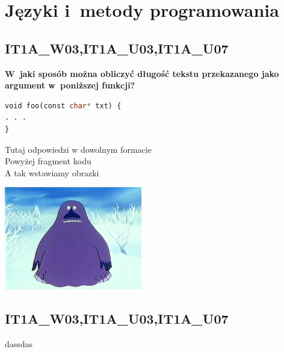 \chapter{Języki i~metody programowania}
\PartialToc
\section{IT1A\_W03,IT1A\_U03,IT1A\_U07}
\textbf{W~jaki sposób można obliczyć długość tekstu przekazanego jako argument w~poniższej funkcji?}
\begin{lstlisting}[language=sql]
void foo(const char* txt) {
. . .
}
\end{lstlisting}

\vspace{0.4cm}
\noindent  Tutaj odpowiedzi w dowolnym formacie\\
Powyżej fragment kodu\\
A tak wstawiamy obrazki\\
\begin{center}
\includegraphics[width=6cm]{buka}
\end{center}


\section{IT1A\_W03,IT1A\_U03,IT1A\_U07}dassdas

